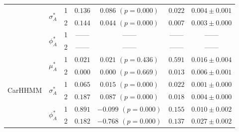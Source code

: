\documentclass{article}
\begin{document}
\begin{center}
{\begin{tabular}{ccccccc}
                            & \multirow{2}{*}{$\sigma_A^*$} & 1                                & $0.136$                         & $0.086$ $(p=0.000)$          & $0.022$                             & $0.004 \pm 0.001$                             \\
                            &                               & 2                                & $0.144$                         & $0.044$ $(p=0.000)$          & $0.007$                             & $0.003 \pm 0.000$                             \\ 
                            & \multirow{2}{*}{$\phi_A^*$}   & 1                                & ------                         & ------                     & ------                             & ------                                      \\
                            &                               & 2                                & ------                         & ------                     & ------                             & ------                                      \\ \hline
\multirow{6}{*}{CarHHMM}    & \multirow{2}{*}{$\mu_A^*$}    & 1                                & $0.021$                         & $0.021$ $(p=0.436)$          & $0.591$                             & $0.016 \pm 0.004$                             \\
                            &                               & 2                                & $0.000$                         & $0.000$ $(p=0.669)$          & $0.013$                             & $0.006 \pm 0.001$                             \\
                            & \multirow{2}{*}{$\sigma_A^*$} & 1                                & $0.065$                         & $0.015$ $(p=0.000)$          & $0.022$                             & $0.001 \pm 0.000$                             \\
                            &                               & 2                                & $0.187$                         & $0.087$ $(p=0.000)$          & $0.018$                             & $0.004 \pm 0.000$                             \\ 
                            & \multirow{2}{*}{$\phi_A^*$}   & 1                                & $0.891$                         & $-0.099$ $(p=0.000)$          & $0.155$                             & $0.010 \pm 0.002$                             \\
                            &                               & 2                                & $0.182$                         & $-0.768$ $(p=0.000)$          & $0.137$                             & $0.027 \pm 0.002$                             \\ \hline

\end{tabular}}
\end{center}
\end{document}
